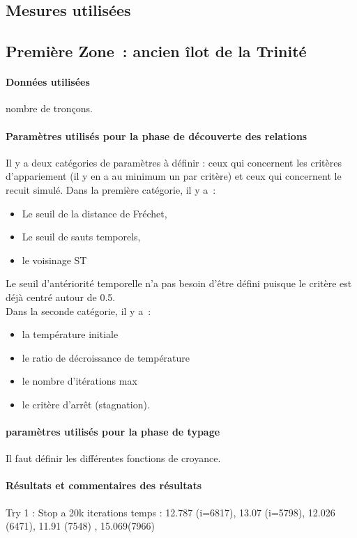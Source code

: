 \documentclass[a4paper,12pt]{article}
\begin{document}
\subsection{Mesures utilisées}


\subsection{Première Zone~: ancien îlot de la Trinité}
\paragraph{Données utilisées}
nombre de tronçons.
\paragraph{Paramètres utilisés pour la phase de découverte des relations}
Il y a deux catégories de paramètres à définir : ceux qui concernent les critères d'appariement (il y en a au minimum un par critère) et ceux qui concernent le recuit simulé.
Dans la première catégorie, il y a~:
\begin{itemize}
\item Le seuil de la distance de Fréchet,
\item Le seuil de sauts temporels,
\item le voisinage ST
\end{itemize}
Le seuil d'antériorité temporelle n'a pas besoin d'être défini puisque le critère est déjà centré autour de 0.5.
\\
Dans la seconde catégorie, il y a~:
\begin{itemize}
\item la température initiale
\item le ratio de décroissance de température
\item le nombre d'itérations max
\item le critère d'arrêt (stagnation).
\end{itemize}

\paragraph{paramètres utilisés pour la phase de typage}
Il faut définir les différentes fonctions de croyance.

\paragraph{Résultats et commentaires des résultats}
Try 1 : Stop a 20k iterations
temps : 12.787 (i=6817), 13.07 (i=5798), 12.026 (6471), 11.91 (7548) , 15.069(7966)
\end{document}
